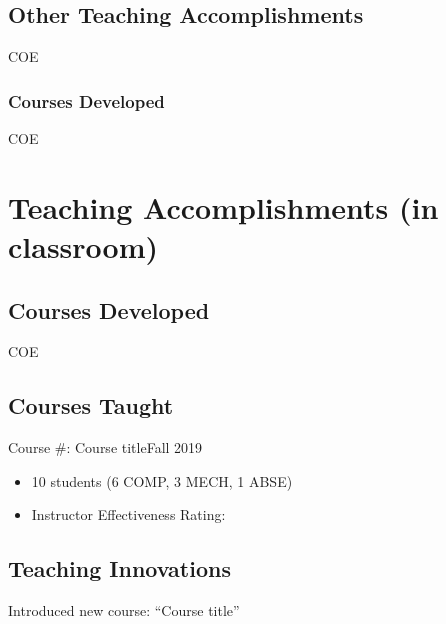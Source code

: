 \subsection{Other Teaching Accomplishments}


\begin{taggedblock}{COE}
  \subsubsection*{Courses Developed}
\end{taggedblock}

\begin{untaggedblock}{COE}
  \section{Teaching Accomplishments (in classroom)}
  \subsection{Courses Developed}  
\end{untaggedblock}


\begin{untaggedblock}{COE}
  \subsection{Courses Taught}
  \begin{myitemize}
  \item Course \#: Course title\hfill Fall 2019
    \begin{itemize}
    \item[] 10 students (6 COMP, 3 MECH, 1 ABSE)
    \item[] Instructor Effectiveness Rating: 
    \end{itemize}
  \end{myitemize}

  \subsection{Teaching Innovations}
  \begin{myitemize}
  \item Introduced new course: ``Course title''
  \end{myitemize}

\end{untaggedblock}

